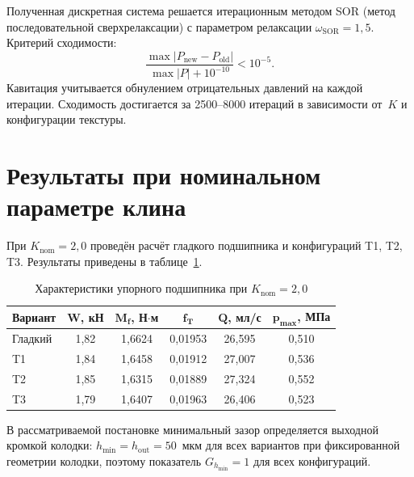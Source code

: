Полученная дискретная система решается итерационным
методом SOR (метод последовательной сверхрелаксации) с параметром
релаксации $\omega_{\mathrm{SOR}} = 1{,}5$. Критерий сходимости:
\begin{equation}
  \frac{\max |P_{\mathrm{new}} - P_{\mathrm{old}}|}
       {\max |P| + 10^{-10}} < 10^{-5}.
  \label{eq:thrust_convergence}
\end{equation}
Кавитация учитывается обнулением отрицательных давлений
на каждой итерации. Сходимость достигается за 2500--8000 итераций
в зависимости от~$K$ и конфигурации текстуры.


\section{Результаты при номинальном параметре клина}

При $K_{\mathrm{nom}} = 2{,}0$ проведён расчёт гладкого
подшипника и конфигураций T1, T2, T3. Результаты приведены
в таблице~\ref{tab:thrust_results}.

\begin{table}[!ht]
\centering
\caption{Характеристики упорного подшипника при $K_{\mathrm{nom}} = 2{,}0$}
\label{tab:thrust_results}
\begin{tabularx}{\textwidth}{|X|c|c|c|c|c|}
\hline
\multicolumn{1}{|c|}{\textbf{Вариант}}
  & $\boldsymbol{W}$, \textbf{кН}
  & $\boldsymbol{M_f}$, \textbf{Н$\cdot$м}
  & $\boldsymbol{f_T}$
  & $\boldsymbol{Q}$, \textbf{мл/с}
  & $\boldsymbol{p_{\max}}$, \textbf{МПа} \\
\hline
Гладкий & 1{,}82 & 1{,}6624 & 0{,}01953 & 26{,}595 & 0{,}510 \\
\hline
T1      & 1{,}84 & 1{,}6458 & 0{,}01912 & 27{,}007 & 0{,}536 \\
\hline
T2      & 1{,}85 & 1{,}6315 & 0{,}01889 & 27{,}324 & 0{,}552 \\
\hline
T3      & 1{,}79 & 1{,}6407 & 0{,}01963 & 26{,}406 & 0{,}523 \\
\hline
\end{tabularx}
\end{table}

\FloatBarrier

В рассматриваемой постановке минимальный зазор определяется
выходной кромкой колодки:
$h_{\min} = h_{\mathrm{out}} = 50$~мкм для всех вариантов
при фиксированной геометрии колодки, поэтому показатель
$G_{h_{\min}} = 1$ для всех конфигураций.

